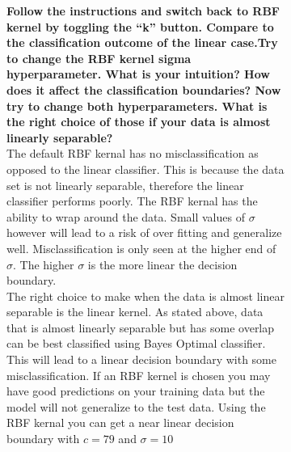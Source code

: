 \documentclass[11pt,oneside,a4paper]{article}
\begin{document}
 \begin{figure}[h!]
 	\centering
 	\begin{subfigure}[b]{.5\textwidth}
 	
 		\textbf{Follow the instructions and switch back to RBF kernel by toggling the “k” button. Compare to the classification outcome of the linear case.Try to change the RBF kernel sigma hyperparameter. What is your intuition? How does it affect the classification boundaries? Now try to change both hyperparameters. What is the right choice of those if your data is almost linearly separable?}\\
 		
		 The default RBF kernal has no misclassification as opposed to the linear classifier. This is because the data set is not linearly separable, therefore the linear classifier performs poorly. The RBF kernal has the ability to wrap around the data. Small values of  $\sigma$ however will lead to a risk of over fitting and generalize well. Misclassification is only seen at the higher end of  $\sigma$. The higher  $\sigma$  is the more linear the decision boundary. \\
		 
		 The right choice to make when the data is almost linear separable is the linear kernel. As stated above, data that is almost linearly separable but has some overlap can be best classified using Bayes Optimal classifier. This will lead to a linear decision boundary with some misclassification. If an RBF kernel is chosen you may have good predictions on your training data but the model will not generalize to the test data. Using the RBF kernal you can get a near linear decision boundary with $ c = 79$ and $\sigma = 10$
		 
 		
 	

\end{subfigure}
\end{figure}
\end{document}
